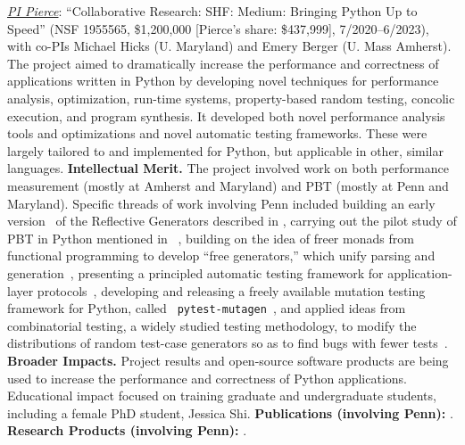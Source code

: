 {


\emph{\underline{PI Pierce}}: ``Collaborative Research:
SHF: Medium: Bringing Python Up to Speed'' (NSF 1955565, \$1,200,000
[Pierce's share: \$437,999],
7/2020--6/2023), with co-PIs Michael Hicks (U. Maryland) and Emery Berger
(U. Mass Amherst).
The project aimed to dramatically increase the performance and
correctness of applications written in Python by developing novel
techniques for performance analysis, optimization, run-time systems,
property-based random testing, concolic execution, and program
synthesis. It developed both
novel performance analysis tools and optimizations and novel automatic
testing frameworks. These were largely tailored to and implemented for
Python, but applicable in other, similar languages.
%
{\bf Intellectual Merit.} The project involved work on both
performance measurement (mostly at Amherst and Maryland) and PBT (mostly at Penn
and Maryland).  Specific threads of work involving Penn included
building an early
version~\cite{goldstein2023reflecting} of the Reflective Generators described in
, carrying out the pilot study of PBT in Python
mentioned in
~\cite{goldstein_problems_2022},
building on the idea of
freer monads from functional programming to develop ``free
generators,'' which unify parsing and
generation~\cite{goldstein2022parsing},
presenting a principled
automatic testing framework for application-layer
protocols~\cite{Li2021:MBToNA}, developing and releasing a freely
available mutation testing framework for Python, called {\tt
  pytest-mutagen}~\cite{pytestmutagen}, and applied ideas from
combinatorial testing, a widely studied testing methodology, to modify
the distributions of random test-case generators so as to find bugs
with fewer tests~\cite{DBLP:conf/esop/GoldsteinHLP21}.
%
{\bf Broader Impacts.} Project results and open-source software
products are being used to increase the
performance and correctness of Python applications.
Educational impact focused on training graduate and
undergraduate students, including a female PhD student, Jessica
Shi.
%
{\bf Publications (involving Penn):} \cite{goldstein2023reflecting,DBLP:conf/esop/GoldsteinHLP21,
  goldstein2022parsing, goldstein_problems_2022, Li2021:MBToNA}.
{\bf Research Products (involving Penn):} \cite{pytestmutagen}.

}
